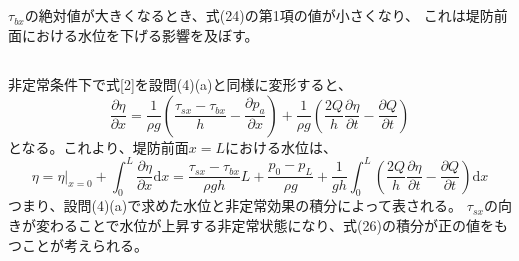 \documentclass[a4paper]{jsarticle}
\begin{document}
\subsection{}
$\tau_{bx}$の絶対値が大きくなるとき、式(24)の第1項の値が小さくなり、
これは堤防前面における水位を下げる影響を及ぼす。

\subsection{}
非定常条件下で式[2]を設問(4)(a)と同様に変形すると、
\begin{equation}
  \frac{\partial \eta}{\partial x} =
  \frac{1}{\rho g} \left(\frac{\tau_{sx} - \tau_{bx}}{h} - 
  \frac{\partial p_a}{\partial x}\right) +
  \frac{1}{\rho g} \left(\frac{2Q}{h} \frac{\partial \eta}{\partial t} - \frac{\partial Q}{\partial t}\right)
\end{equation}
となる。これより、堤防前面$x = L$における水位は、
\begin{equation}
  \eta = \left. \eta \right|_{x = 0} + \int_0^L \frac{\partial \eta}{\partial x} \mathrm{d} x
  = \frac{\tau_{sx} - \tau_{bx}}{\rho g h} L + \frac{p_0 - p_L}{\rho g}
  + \frac{1}{g h} \int_0^L \left(\frac{2 Q}{h} \frac{\partial \eta}{\partial t} - \frac{\partial Q}{\partial t}\right) \mathrm{d} x
\end{equation}
つまり、設問(4)(a)で求めた水位と非定常効果の積分によって表される。
$\tau_{sx}$の向きが変わることで水位が上昇する非定常状態になり、式(26)の積分が正の値をもつことが考えられる。
\end{document}
